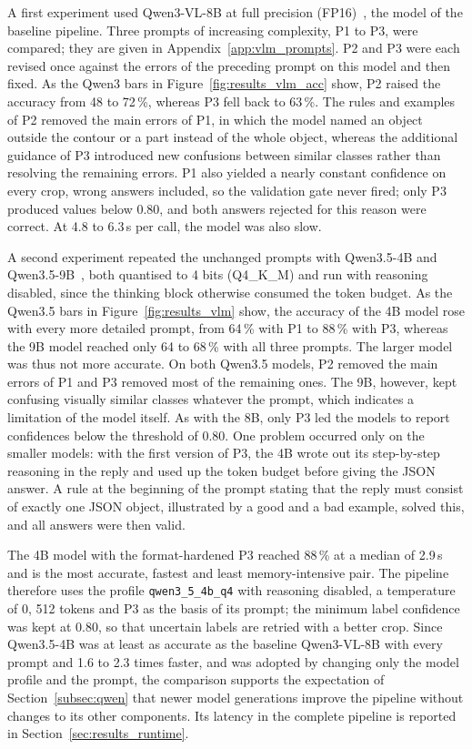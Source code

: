 {\small A first experiment used Qwen3-VL-8B at full precision (FP16)~\cite{bai2025qwen3vl}, the model of the baseline pipeline. Three prompts of increasing complexity, P1 to P3, were compared; they are given in Appendix~\ref{app:vlm_prompts}. P2 and P3 were each revised once against the errors of the preceding prompt on this model and then fixed. As the Qwen3 bars in Figure~\ref{fig:results_vlm_acc} show, P2 raised the accuracy from 48 to 72\,\%, whereas P3 fell back to 63\,\%. The rules and examples of P2 removed the main errors of P1, in which the model named an object outside the contour or a part instead of the whole object, whereas the additional guidance of P3 introduced new confusions between similar classes rather than resolving the remaining errors. P1 also yielded a nearly constant confidence on every crop, wrong answers included, so the validation gate never fired; only P3 produced values below 0.80, and both answers rejected for this reason were correct. At 4.8 to 6.3\,s per call, the model was also slow.\par}

{\small A second experiment repeated the unchanged prompts with Qwen3.5-4B and Qwen3.5-9B~\cite{qwen2026qwen35}, both quantised to 4 bits (Q4\_K\_M) and run with reasoning disabled, since the thinking block otherwise consumed the token budget. As the Qwen3.5 bars in Figure~\ref{fig:results_vlm} show, the accuracy of the 4B model rose with every more detailed prompt, from 64\,\% with P1 to 88\,\% with P3, whereas the 9B model reached only 64 to 68\,\% with all three prompts. The larger model was thus not more accurate. On both Qwen3.5 models, P2 removed the main errors of P1 and P3 removed most of the remaining ones. The 9B, however, kept confusing visually similar classes whatever the prompt, which indicates a limitation of the model itself. As with the 8B, only P3 led the models to report confidences below the threshold of 0.80. One problem occurred only on the smaller models: with the first version of P3, the 4B wrote out its step-by-step reasoning in the reply and used up the token budget before giving the JSON answer. A rule at the beginning of the prompt stating that the reply must consist of exactly one JSON object, illustrated by a good and a bad example, solved this, and all answers were then valid.\par}

{\small The 4B model with the format-hardened P3 reached 88\,\% at a median of 2.9\,s and is the most accurate, fastest and least memory-intensive pair. The pipeline therefore uses the profile \texttt{qwen3\_5\_4b\_q4} with reasoning disabled, a temperature of 0, 512 tokens and P3 as the basis of its prompt; the minimum label confidence was kept at 0.80, so that uncertain labels are retried with a better crop. Since Qwen3.5-4B was at least as accurate as the baseline Qwen3-VL-8B with every prompt and 1.6 to 2.3 times faster, and was adopted by changing only the model profile and the prompt, the comparison supports the expectation of Section~\ref{subsec:qwen} that newer model generations improve the pipeline without changes to its other components. Its latency in the complete pipeline is reported in Section~\ref{sec:results_runtime}.\par}


